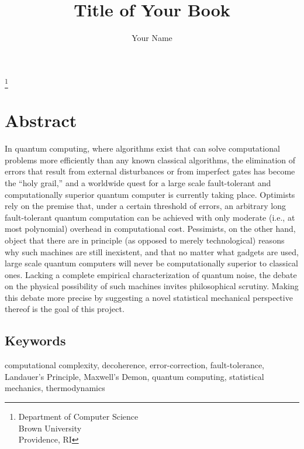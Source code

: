 
\title{Title of Your Book}

\author{Your Name}
\thanks{Department of Computer Science\\
Brown University\\
Providence, RI}

\maketitle

\chapter*{Abstract}

In quantum computing, where algorithms
exist that can solve computational problems
more efficiently than any known classical
algorithms, the elimination of errors
that result from external disturbances
or from imperfect gates has become the
``holy grail,'' and a worldwide quest for
a large scale fault-tolerant and computationally
superior quantum computer is currently
taking place. Optimists rely on the premise
that, under a certain threshold of errors,
an arbitrary long fault-tolerant quantum
computation can be achieved with only
moderate (i.e., at most polynomial) overhead in computational cost.
Pessimists, on the other hand, object
that there are in principle (as opposed
to merely technological) reasons why such
machines are still inexistent, and that
no matter what gadgets are used, large
scale quantum computers will never be
computationally superior to classical
ones. Lacking a complete empirical characterization
of quantum noise, the debate on the physical
possibility of such machines invites philosophical
scrutiny. Making this debate more precise
by suggesting a novel statistical mechanical
perspective thereof is the goal of this project.

\section*{Keywords}

computational complexity, decoherence,
error-correction, fault-tolerance, Landauer's
Principle, Maxwell's Demon, quantum computing,
statistical mechanics, thermodynamics


\tableofcontents

\listoffigures

\listoftables


